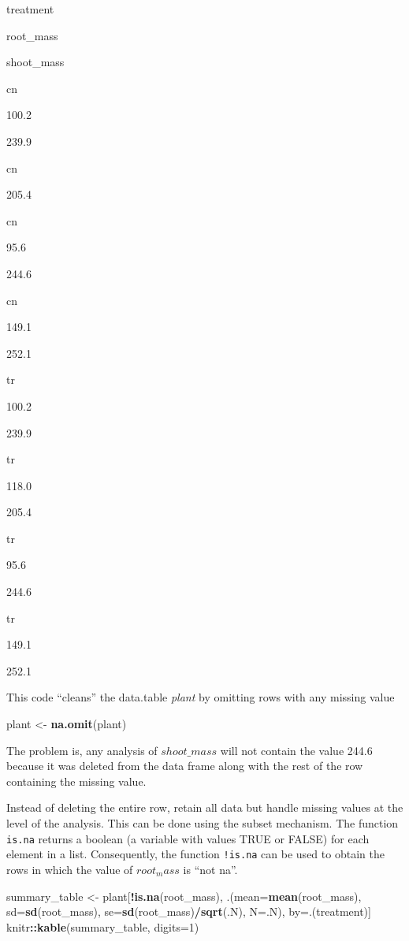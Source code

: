 \documentclass[]{book}
\newenvironment{Shaded}{\begin{snugshade}}{\end{snugshade}}
\newcommand{\KeywordTok}[1]{\textcolor[rgb]{0.13,0.29,0.53}{\textbf{#1}}}
\newcommand{\DataTypeTok}[1]{\textcolor[rgb]{0.13,0.29,0.53}{#1}}
\newcommand{\DecValTok}[1]{\textcolor[rgb]{0.00,0.00,0.81}{#1}}
\newcommand{\StringTok}[1]{\textcolor[rgb]{0.31,0.60,0.02}{#1}}
\newcommand{\OperatorTok}[1]{\textcolor[rgb]{0.81,0.36,0.00}{\textbf{#1}}}
\newcommand{\NormalTok}[1]{#1}
\begin{document}
treatment

root\_mass

shoot\_mass

cn

100.2

239.9

cn

205.4

cn

95.6

244.6

cn

149.1

252.1

tr

100.2

239.9

tr

118.0

205.4

tr

95.6

244.6

tr

149.1

252.1

This code ``cleans'' the data.table \emph{plant} by omitting rows with
any missing value

\begin{Shaded}
\begin{Highlighting}[]
\NormalTok{plant <-}\StringTok{ }\KeywordTok{na.omit}\NormalTok{(plant)}
\end{Highlighting}
\end{Shaded}

The problem is, any analysis of \(shoot\_mass\) will not contain the
value 244.6 because it was deleted from the data frame along with the
rest of the row containing the missing value.

Instead of deleting the entire row, retain all data but handle missing
values at the level of the analysis. This can be done using the subset
mechanism. The function \texttt{is.na} returns a boolean (a variable
with values TRUE or FALSE) for each element in a list. Consequently, the
function \texttt{!is.na} can be used to obtain the rows in which the
value of \(root_mass\) is ``not na''.

\begin{Shaded}
\begin{Highlighting}[]
\NormalTok{summary_table <-}\StringTok{ }\NormalTok{plant[}\OperatorTok{!}\KeywordTok{is.na}\NormalTok{(root_mass),}
\NormalTok{                       .(}\DataTypeTok{mean=}\KeywordTok{mean}\NormalTok{(root_mass),}
                         \DataTypeTok{sd=}\KeywordTok{sd}\NormalTok{(root_mass),}
                         \DataTypeTok{se=}\KeywordTok{sd}\NormalTok{(root_mass)}\OperatorTok{/}\KeywordTok{sqrt}\NormalTok{(.N),}
                         \DataTypeTok{N=}\NormalTok{.N), }
\NormalTok{                       by=.(treatment)]}
\NormalTok{knitr}\OperatorTok{::}\KeywordTok{kable}\NormalTok{(summary_table, }\DataTypeTok{digits=}\DecValTok{1}\NormalTok{)}
\end{Highlighting}
\end{Shaded}
\end{document}
